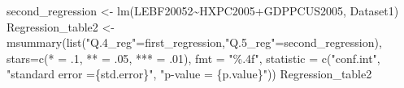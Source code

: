 \documentclass[
]{article}
\newenvironment{Shaded}{\begin{snugshade}}{\end{snugshade}}
\newcommand{\AttributeTok}[1]{\textcolor[rgb]{0.77,0.63,0.00}{#1}}
\newcommand{\DecValTok}[1]{\textcolor[rgb]{0.00,0.00,0.81}{#1}}
\newcommand{\FunctionTok}[1]{\textcolor[rgb]{0.00,0.00,0.00}{#1}}
\newcommand{\NormalTok}[1]{#1}
\newcommand{\OtherTok}[1]{\textcolor[rgb]{0.56,0.35,0.01}{#1}}
\newcommand{\SpecialCharTok}[1]{\textcolor[rgb]{0.00,0.00,0.00}{#1}}
\newcommand{\StringTok}[1]{\textcolor[rgb]{0.31,0.60,0.02}{#1}}
\begin{document}
\begin{Shaded}
\begin{Highlighting}[]
\NormalTok{second\_regression }\OtherTok{\textless{}{-}} \FunctionTok{lm}\NormalTok{(LEBF20052}\SpecialCharTok{\textasciitilde{}}\NormalTok{HXPC2005}\SpecialCharTok{+}\NormalTok{GDPPCUS2005, Dataset1)}
\NormalTok{Regression\_table2 }\OtherTok{\textless{}{-}} \FunctionTok{msummary}\NormalTok{(}\FunctionTok{list}\NormalTok{(}\StringTok{"Q.4\_reg"}\OtherTok{=}\NormalTok{first\_regression,}\StringTok{"Q.5\_reg"}\OtherTok{=}\NormalTok{second\_regression), }
                              \AttributeTok{stars=}\FunctionTok{c}\NormalTok{(}\StringTok{\textquotesingle{}*\textquotesingle{}} \OtherTok{=}\NormalTok{ .}\DecValTok{1}\NormalTok{, }\StringTok{\textquotesingle{}**\textquotesingle{}} \OtherTok{=}\NormalTok{ .}\DecValTok{05}\NormalTok{, }\StringTok{\textquotesingle{}***\textquotesingle{}} \OtherTok{=}\NormalTok{ .}\DecValTok{01}\NormalTok{),}
                              \AttributeTok{fmt =} \StringTok{"\%.4f"}\NormalTok{,  }\AttributeTok{statistic =} \FunctionTok{c}\NormalTok{(}\StringTok{"conf.int"}\NormalTok{,  }\StringTok{"standard error }
\StringTok{                                                           =\{std.error\}"}\NormalTok{, }
                                            \StringTok{"p{-}value = \{p.value\}"}\NormalTok{))}
\NormalTok{Regression\_table2}
\end{Highlighting}
\end{Shaded}
\end{document}
